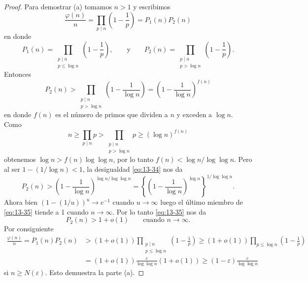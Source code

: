 \documentclass[12pt,a4paper]{book}
\begin{document}
\begin{proof}
        Para demostrar (a) tomamos $n>1$ y escribimos
        \begin{equation*}
            \frac{\varphi(n)}{n}=\prod_{p\mid n}\left(1-\frac{1}{p}\right)=P_{1}(n)P_{2}(n)
        \end{equation*}
        en donde
        \begin{equation*}
            P_{1}(n)=\prod_{\substack{p\mid n\\p\leq\log n}}\left(1-\frac{1}{p}\right),\qquad\text{y}\qquad P_{2}(n)=\prod_{\substack{p\mid n\\p>\log n}}\left(1-\frac{1}{p}\right).
        \end{equation*}
        Entonces
        \begin{equation}\label{eq:13-34}
            P_{2}(n)>\prod_{\substack{p\mid n\\p>\log n}}\left(1-\frac{1}{\log n}\right)=\left(1-\frac{1}{\log n}\right)^{f(n)}
        \end{equation}
        en donde $f(n)$ es el número de primos que dividen a $n$ y exceden a $\log n$. Como
        \begin{equation*}
            n\geq\prod_{p\mid n}p>\prod_{\substack{p\mid n\\p>\log n}}p\geq(\log n)^{f(n)}
        \end{equation*}
        obtenemos $\log n>f(n)\log\log n$, por lo tanto $f(n)<\log n/\log\log n$. Pero al ser
        $1-(1/\log n)<1$, la desigualdad \eqref{eq:13-34} nos da
        \begin{equation}\label{eq:13-35}
            P_{2}(n)>\left(1-\frac{1}{\log n}\right)^{\log n/\log\log n}=\left\{\left(1-\frac{1}{\log n}\right)^{\log n}\right\}^{1/\log\log n}.
        \end{equation}
        Ahora bien $(1-(1/u))^{u}\to e^{-1}$ cuando $u\to\infty$ luego el último miembro de
        \eqref{eq:13-35} tiende a 1 cuando $n\to\infty$. Por lo tanto \eqref{eq:13-35} nos da
        \begin{equation*}
            P_{2}(n)>1+o(1)\qquad\text{cuando }n\to\infty.
        \end{equation*}
        Por consiguiente
        \begin{align*}
            \frac{\varphi(n)}{n}=P_{1}(n)P_{2}(n)&>(1+o(1))\prod_{\substack{p\mid n\\p\leq\log n}}\left(1-\frac{1}{p}\right)\geq(1+o(1))\prod_{p\leq\log n}\left(1-\frac{1}{p}\right)\\
            &=(1+o(1))\frac{c}{\log\log n}(1+o(1))\geq(1-\varepsilon)\frac{c}{\log\log n}
        \end{align*}
        si $n\geq N(\varepsilon)$. Esto demuestra la parte (a).
    \end{proof}
\end{document}
